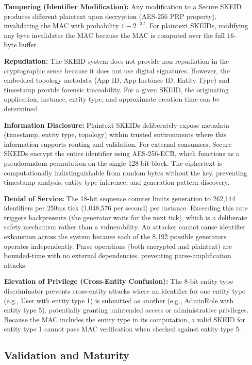 \documentclass[fleqn,10pt]{wlpeerj}
\begin{document}
\textbf{Tampering (Identifier Modification):} Any modification to a
Secure SKEID produces different plaintext upon decryption (AES-256 PRP
property), invalidating the MAC with probability \(1 - 2^{-32}\). For
plaintext SKEIDs, modifying any byte invalidates the MAC because the MAC
is computed over the full 16-byte buffer.

\textbf{Repudiation:} The SKEID system does not provide non-repudiation
in the cryptographic sense because it does not use digital signatures.
However, the embedded topology metadata (App ID, App Instance ID, Entity
Type) and timestamp provide forensic traceability. For a given SKEID,
the originating application, instance, entity type, and approximate
creation time can be determined.

\textbf{Information Disclosure:} Plaintext SKEIDs deliberately expose
metadata (timestamp, entity type, topology) within trusted environments
where this information supports routing and validation. For external
consumers, Secure SKEIDs encrypt the entire identifier using
AES-256-ECB, which functions as a pseudorandom permutation on the single
128-bit block. The ciphertext is computationally indistinguishable from
random bytes without the key, preventing timestamp analysis, entity type
inference, and generation pattern discovery.

\textbf{Denial of Service:} The 18-bit sequence counter limits
generation to 262,144 identifiers per 250ms tick (1,048,576 per second)
per instance. Exceeding this rate triggers backpressure (the generator
waits for the next tick), which is a deliberate safety mechanism rather
than a vulnerability. An attacker cannot cause identifier exhaustion
across the system because each of the 8,192 possible generators operates
independently. Parse operations (both encrypted and plaintext) are
bounded-time with no external dependencies, preventing
parse-amplification attacks.

\textbf{Elevation of Privilege (Cross-Entity Confusion):} The 8-bit
entity type discriminator prevents cross-entity attacks where an
identifier for one entity type (e.g., User with entity type 1) is
submitted as another (e.g., AdminRole with entity type 5), potentially
granting unintended access or administrative privileges. Because the MAC
includes the entity type in its computation, a valid SKEID for entity
type 1 cannot pass MAC verification when checked against entity type 5.

\subsection{Validation and Maturity}\label{validation-and-maturity}
\end{document}

